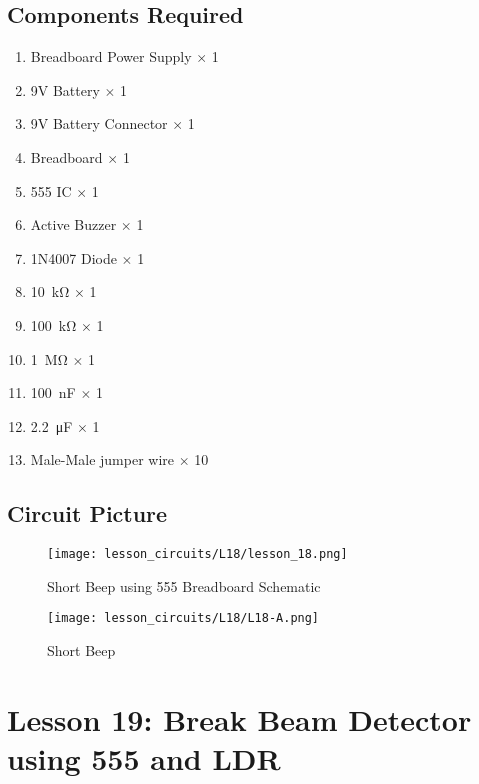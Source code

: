 \subsection{Components Required}
\begin{enumerate}
    \item Breadboard Power Supply $\times$ 1
    \item 9V Battery $\times$ 1
    \item 9V Battery Connector $\times$ 1
    \item Breadboard $\times$ 1
    \item 555 IC $\times$ 1
    \item Active Buzzer $\times$ 1
    \item 1N4007 Diode $\times$ 1
    \item \SI{10}{\kilo\ohm} $\times$ 1
    \item \SI{100}{\kilo\ohm} $\times$ 1
    \item \SI{1}{\Mohm} $\times$ 1
    \item \SI{100}{\nano\farad} $\times$ 1
    \item \SI{2.2}{\micro\farad} $\times$ 1
    \item Male-Male jumper wire $\times$ 10
\end{enumerate}
\subsection{Circuit Picture}
\begin{figure}[!h]
    \centering
    \texttt{[image: lesson\_circuits/L18/lesson\_18.png]}
    \caption{Short Beep using 555 Breadboard Schematic}
    \label{fig:555_sbeep_sch}
\end{figure}
\begin{figure}[!h]
    \centering
    \texttt{[image: lesson\_circuits/L18/L18-A.png]}
    \caption{Short Beep}
    \label{fig:555_sbeep_obb}
\end{figure}
\section{Lesson 19: Break Beam Detector using 555 and LDR}
